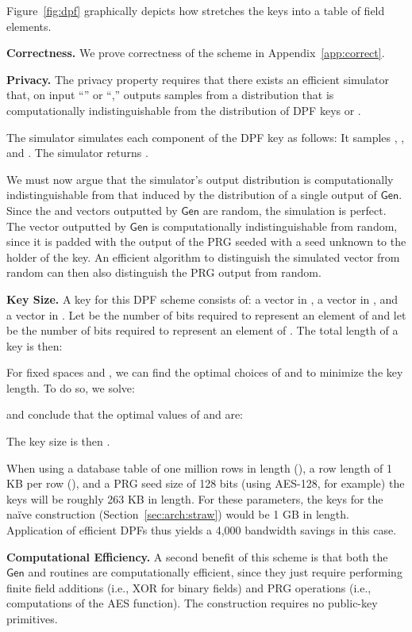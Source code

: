 \documentclass[10pt,twocolumn]{article}
\newcommand{\Gen}{\ensuremath{\mathsf{Gen}}\xspace}
\newcommand{\nicepara}[1]{\medskip\noindent\textbf{#1.}}
\begin{document}
Figure~\ref{fig:dpf} graphically depicts
how  stretches the 
keys into a table of  field elements.

\nicepara{Correctness}
We prove correctness of the scheme in Appendix~\ref{app:correct}.

\nicepara{Privacy}
The privacy property requires that there exists
an efficient simulator that, on input ``'' or ``,''
outputs samples from a distribution that is computationally
indistinguishable from the distribution of DPF keys
 or .

The simulator  simulates each component of the
DPF key as follows:
It samples 
,
, and
. 
The simulator returns .

We must now argue that the simulator's output distribution
is computationally indistinguishable from that induced by the
distribution of a single output of \Gen.
Since the  and  vectors outputted by 
\Gen are random, the simulation is perfect.
The  vector outputted by \Gen is computationally indistinguishable
from random, since it is padded with the output of the PRG seeded with 
a seed unknown to the holder of the key.
An efficient algorithm
to distinguish the simulated  vector from 
random can then also distinguish the PRG output from random.

\nicepara{Key Size}
A key for this DPF scheme consists of:
a vector in ,
a vector in , and
a vector in .
Let  be the number of bits required to represent
an element of  and let  be the number of
bits required to represent an element of .
The total length of a key is then:

For fixed spaces  and , we can find the optimal
choices of  and  to minimize the key length.
To do so, we solve:

and conclude that the optimal values of  and  are:

The key size is then .

When using a database table of 
one million rows in length (),
a row length of 1 KB per row (), 
and a PRG seed size of 128 bits (using AES-128, for example)
the keys will be roughly 263 KB in length.
For these parameters, 
the keys for the na\"ive construction
(Section~\ref{sec:arch:straw})
would be 1 GB in length.
Application of efficient DPFs thus yields
a 4,000 bandwidth savings in this case.

\nicepara{Computational Efficiency}
A second benefit of this scheme is that
both the \Gen and  routines are 
computationally efficient, since they just require performing
finite field additions (i.e., XOR for binary fields)
and PRG operations (i.e., computations of the AES function).
The construction requires no public-key primitives. 
\end{document}
